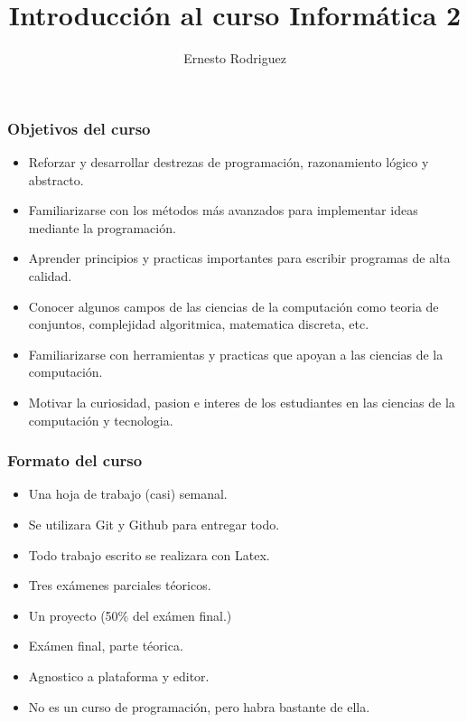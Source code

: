 \documentclass{beamer}
\title[Introducciòn]{Introducci\'on al curso Inform\'atica 2}
\author{Ernesto Rodriguez}
\institute{
    Universidad del Itsmo \\
    \medskip \textit{erodriguez@unis.edu.gt}
}
\date[\today]{}
\begin{document}
\begin{frame}
\titlepage
\end{frame}

\begin{frame}
    \frametitle{Objetivos del curso}
    \begin{itemize}
        \item{Reforzar y desarrollar destrezas de programaci\'on, razonamiento l\'ogico y abstracto.}
        \item{Familiarizarse con los m\'etodos m\'as avanzados para implementar ideas mediante la programaci\'on.}
        \item{Aprender principios y practicas importantes para escribir programas de alta calidad.}
        \item{Conocer algunos campos de las ciencias de la computaci\'on como teoria de conjuntos, complejidad algoritmica, matematica discreta, etc.}
        \item{Familiarizarse con herramientas y practicas que apoyan a las ciencias de la computaci\'on.}
        \item{Motivar la curiosidad, pasion e interes de los estudiantes en las ciencias de la computaci\'on y tecnologia.}
    \end{itemize}
\end{frame}

\begin{frame}
    \frametitle{Formato del curso}
    \begin{itemize}
        \item{Una hoja de trabajo (casi) semanal.}
        \item{Se utilizara Git y Github para entregar todo.}
        \item{Todo trabajo escrito se realizara con Latex.}
        \item{Tres ex\'amenes parciales t\'eoricos.}
        \item{Un proyecto (50\% del ex\'amen final.)}
        \item{Ex\'amen final, parte t\'eorica.}
        \item{Agnostico a plataforma y editor.}
        \item{No es un curso de programaci\'on, pero habra bastante de ella.}
    \end{itemize}
\end{frame}
\end{document}
